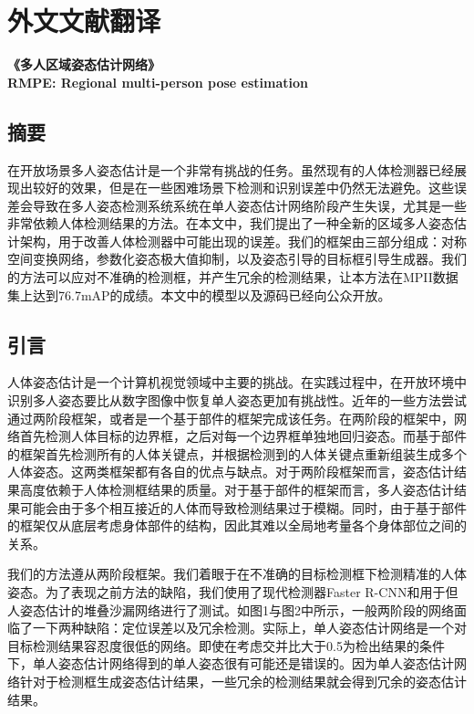 \chapter*{外文文献翻译}
{\centering
\begin{minipage}{\linewidth}
	\centering
	\xiaosan
	\bfseries
	《多人区域姿态估计网络》\\ 
	RMPE: Regional multi-person pose estimation
\end{minipage}
}
\label{cha:engtrans}
\section*{摘要}
在开放场景多人姿态估计是一个非常有挑战的任务。虽然现有的人体检测器已经展现出较好的效果，但是在一些困难场景下检测和识别误差中仍然无法避免。这些误差会导致在多人姿态检测系统系统在单人姿态估计网络阶段产生失误，尤其是一些非常依赖人体检测结果的方法。在本文中，我们提出了一种全新的区域多人姿态估计架构，用于改善人体检测器中可能出现的误差。我们的框架由三部分组成：对称空间变换网络，参数化姿态极大值抑制，以及姿态引导的目标框引导生成器。我们的方法可以应对不准确的检测框，并产生冗余的检测结果，让本方法在MPII数据集上达到76.7mAP的成绩。本文中的模型以及源码已经向公众开放。

\section*{引言}
人体姿态估计是一个计算机视觉领域中主要的挑战。在实践过程中，在开放环境中识别多人姿态要比从数字图像中恢复单人姿态更加有挑战性。近年的一些方法尝试通过两阶段框架，或者是一个基于部件的框架完成该任务。在两阶段的框架中，网络首先检测人体目标的边界框，之后对每一个边界框单独地回归姿态。而基于部件的框架首先检测所有的人体关键点，并根据检测到的人体关键点重新组装生成多个人体姿态。这两类框架都有各自的优点与缺点。对于两阶段框架而言，姿态估计结果高度依赖于人体检测框结果的质量。对于基于部件的框架而言，多人姿态估计结果可能会由于多个相互接近的人体而导致检测结果过于模糊。同时，由于基于部件的框架仅从底层考虑身体部件的结构，因此其难以全局地考量各个身体部位之间的关系。

我们的方法遵从两阶段框架。我们着眼于在不准确的目标检测框下检测精准的人体姿态。为了表现之前方法的缺陷，我们使用了现代检测器Faster R-CNN和用于但人姿态估计的堆叠沙漏网络进行了测试。如图1与图2中所示，一般两阶段的网络面临了一下两种缺陷：定位误差以及冗余检测。实际上，单人姿态估计网络是一个对目标检测结果容忍度很低的网络。即使在考虑交并比大于0.5为检出结果的条件下，单人姿态估计网络得到的单人姿态很有可能还是错误的。因为单人姿态估计网络针对于检测框生成姿态估计结果，一些冗余的检测结果就会得到冗余的姿态估计结果。

